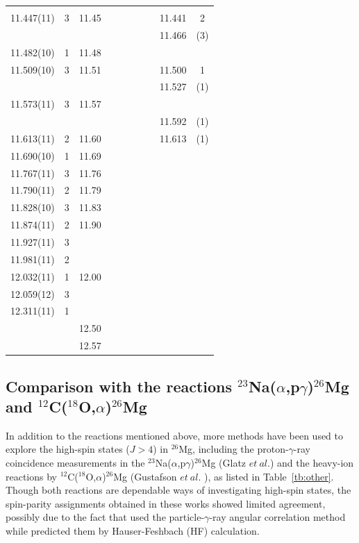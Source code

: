 {\begin{landscape}
\begin{center}
\begin{longtable}{cc cc cc cc cc}
	&		&		&		&		&		&		&		&		&		\\
    11.447(11)  	&	3	&	11.45	&		&		&		&		&		&	11.441	&	2	\\
	&		&		&		&		&		&		&		&	11.466	&	(3)	\\
    11.482(10)  	&	1	&	11.48	&		&		&		&		&		&		&		\\
    11.509(10)  	&	3	&	11.51	&		&		&		&		&		&	11.500	&	1	\\
	&		&		&		&		&		&		&		&	11.527	&	(1)	\\
     11.573(11) 	&	3	&	11.57	&		&		&		&		&		&		&		\\
	&		&		&		&		&		&		&		&	11.592	&	(1)	\\
     11.613(11) 	&	2	&	11.60	&		&		&		&		&		&	11.613	&	(1)	\\
   11.690(10)   	&	1	&	11.69	&		&		&		&		&		&		&		\\
   11.767(11)   	&	3	&	11.76	&		&		&		&		&		&		&		\\
   11.790(11)   	&	2	&	11.79	&		&		&		&		&		&		&		\\
   11.828(10)   	&	3	&	11.83	&		&		&		&		&		&		&		\\
     11.874(11) 	&	2	&	11.90	&		&		&		&		&		&		&		\\
    11.927(11)  	&	3	&		&		&		&		&		&		&		&		\\
    11.981(11)  	&	2	&		&		&		&		&		&		&		&		\\
     12.032(11) 	&	1	&	12.00	&		&		&		&		&		&		&		\\
     12.059(12) 	&	3	&		&		&		&		&		&		&		&		\\
    12.311(11)  	&	1	&		&		&		&		&		&		&		&		\\
	&		&	12.50	&		&		&		&		&		&		&		\\
	&		&	12.57	&		&		&		&		&		&		&		\\

    \end{longtable}
\end{center}
\end{landscape}



\subsection{Comparison with the reactions $^{23}$Na($\alpha$,p$\gamma$)$^{26}$Mg and $^{12}$C($^{18}$O,$\alpha$)$^{26}$Mg}
In addition to the reactions mentioned above, more methods have been used to explore the high-spin states ($J>4$) in $^{26}$Mg, including the proton-$\gamma$-ray coincidence measurements in the $^{23}$Na($\alpha$,p$\gamma$)$^{26}$Mg (Glatz $et\ al.$\citep{Glatz1986}) and the heavy-ion reactions by $^{12}$C($^{18}$O,$\alpha$)$^{26}$Mg (Gustafson $et\ al.$ \citep{Gustafson1976}), as listed in Table~\ref{tb:other}. Though both reactions are dependable ways of investigating high-spin states, the spin-parity assignments obtained in these works showed limited agreement, possibly due to the fact that \citep{Glatz1986} used the particle-$\gamma$-ray angular correlation method while \citep{Gustafson1976} predicted them by Hauser-Feshbach (HF) calculation.

}
